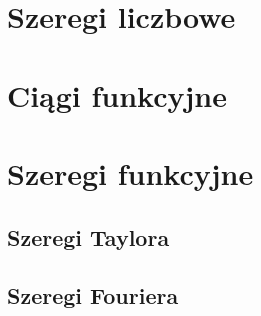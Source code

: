 \documentclass[11pt]{scrartcl}
\begin{document}
    \section{Szeregi liczbowe}
    

    \section{Ciągi funkcyjne}
    

    \section{Szeregi funkcyjne}
    
        \subsection{Szeregi Taylora}
        
        \subsection{Szeregi Fouriera}
        

\end{document}
